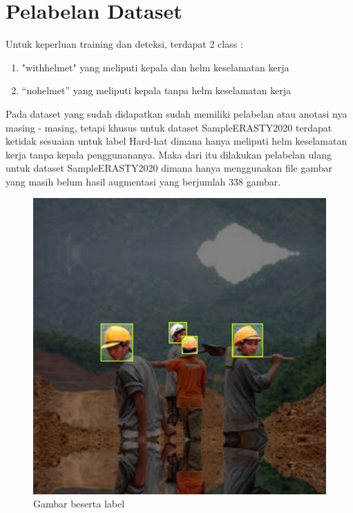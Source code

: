 \section{Pelabelan Dataset}
\label{sec:pelabelandataset}
Untuk keperluan training dan deteksi, terdapat 2 class :

\begin{enumerate}[nolistsep]
  \item "with\textunderscore helmet" yang meliputi kepala dan helm keselamatan kerja
  \item “no\textunderscore helmet” yang meliputi kepala tanpa helm keselamatan kerja
\end{enumerate}


Pada dataset yang sudah didapatkan sudah memiliki pelabelan atau anotasi nya masing - masing, tetapi khusus untuk dataset SampleERASTY2020 terdapat ketidak sesuaian untuk label Hard-hat  dimana hanya meliputi helm keselamatan kerja tanpa kepala penggunananya. Maka dari itu  dilakukan pelabelan ulang untuk dataset SampleERASTY2020 dimana hanya menggunakan file gambar yang masih belum hasil augmentasi yang berjumlah 338 gambar.

\begin{figure}[ht]
  \centering
  \includegraphics[scale=0.2]{gambar/Screenshot_87.png}
  \caption{Gambar beserta label}
  \label{fig:gambarbesertalabel}  
\end{figure}

